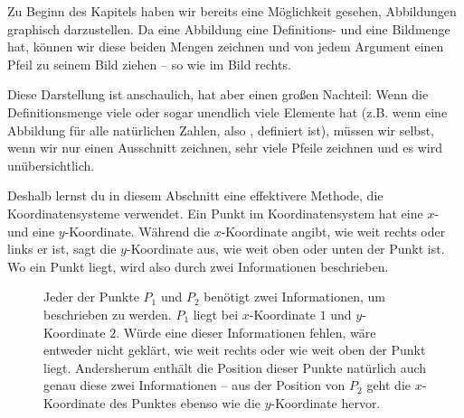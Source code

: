 \documentclass[../../main.tex]{subfiles}
\begin{document}
\label{sec:abbildungen_graphen_intro}
\parpic[r]{
    \centering
}

Zu Beginn des Kapitels haben wir bereits eine Möglichkeit gesehen, Abbildungen graphisch darzustellen. Da eine Abbildung eine Definitions- und eine Bildmenge hat, können wir diese beiden Mengen zeichnen und von jedem Argument einen Pfeil zu seinem Bild ziehen -- so wie im Bild rechts. 

Diese Darstellung ist anschaulich, hat aber einen großen Nachteil: Wenn die Definitionsmenge viele oder sogar unendlich viele Elemente hat (z.B. wenn eine Abbildung für alle natürlichen Zahlen, also \Natural, definiert ist), müssen wir selbst, wenn wir nur einen Ausschnitt zeichnen, sehr viele Pfeile zeichnen und es wird unübersichtlich.

Deshalb lernst du in diesem Abschnitt eine effektivere Methode, die Koordinatensysteme verwendet. Ein Punkt im Koordinatensystem hat eine $x$- und eine $y$-Koordinate. Während die $x$-Koordinate angibt, wie weit rechts oder links er ist, sagt die $y$-Koordinate aus, wie weit oben oder unten der Punkt ist. Wo ein Punkt liegt, wird also durch zwei Informationen beschrieben.

\begin{figure}[ht]
    \centering
    \caption{Jeder der Punkte $P_1$ und $P_2$ benötigt zwei Informationen, um beschrieben zu werden. $P_1$ liegt bei $x$-Koordinate $1$ und $y$-Koordinate $2$. Würde eine dieser Informationen fehlen, wäre entweder nicht geklärt, wie weit rechts oder wie weit oben der Punkt liegt. Andersherum enthält die Position dieser Punkte natürlich auch genau diese zwei Informationen -- aus der Position von $P_2$ geht die $x$-Koordinate des Punktes ebenso wie die $y$-Koordinate hervor.}
\end{figure}
\end{document}
